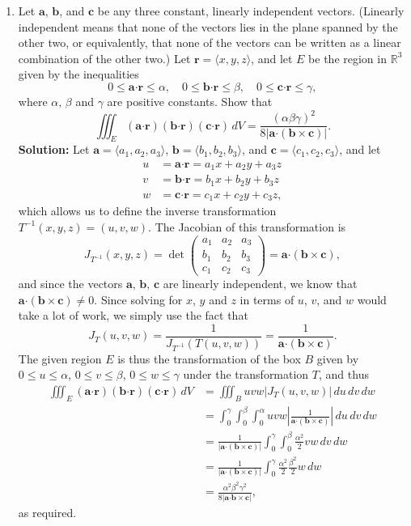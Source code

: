 \documentclass[letterpaper,12pt]{article}
\newcommand{\abs}[1]{\lvert #1\rvert}
\newcommand{\R}{\mathbb{R}}
\newcommand{\dotp}{\boldsymbol{\cdot}}
\newcommand{\aaa}{\mathbf{a}}
\newcommand{\bbb}{\mathbf{b}}
\newcommand{\ccc}{\mathbf{c}}
\renewcommand{\r}{\mathbf{r}}
\begin{document}
\begin{enumerate}
\item  Let $\aaa$, $\bbb$, and $\ccc$ be any three constant, linearly independent vectors. (Linearly independent means that none of the vectors lies in the plane spanned by the other two, or equivalently, that none of the vectors can be written as a linear combination of the other two.) Let $\r = \langle x,y,z\rangle$, and let $E$ be the region in $\R^3$ given by the inequalities
\[
0\leq \aaa\dotp\r\leq \alpha,\quad 0\leq \bbb\dotp\r\leq \beta,\quad 0\leq \ccc\dotp\r\leq \gamma,
\]
where $\alpha,\, \beta$ and $\gamma$ are positive constants. Show that
\[
\iiint_E (\aaa\dotp\r)(\bbb\dotp\r)(\ccc\dotp\r)\,dV = \frac{(\alpha\beta\gamma)^2}{8\abs{\aaa\dotp(\bbb\times\ccc)}}.
\]
\textbf{Solution:} Let $\aaa = \langle a_1,a_2,a_3\rangle$, $\bbb = \langle b_1,b_2,b_3\rangle$, and $\ccc = \langle c_1,c_2,c_3\rangle$, and let
\begin{align*}
u &= \aaa\dotp\r = a_1x+a_2y+a_3z\\
v &= \bbb\dotp\r = b_1x+b_2y+b_3z\\
w &= \ccc\dotp\r = c_1x+c_2y+c_3z,
\end{align*}
which allows us to define the inverse transformation $T^{-1}(x,y,z) = (u,v,w)$. The Jacobian of this transformation is
\[
J_{T^{-1}}(x,y,z) = \det\begin{pmatrix}
a_1&a_2&a_3\\b_1&b_2&b_3\\c_1&c_2&c_3
\end{pmatrix} = \aaa\dotp(\bbb\times\ccc),
\]
and since the vectors $\aaa,\,\bbb,\,\ccc$ are linearly independent, we know that $\aaa\dotp(\bbb\times\ccc)\neq 0$.
Since solving for $x$, $y$ and $z$ in terms of $u$, $v$, and $w$ would take a lot of work, we simply use the fact that
\[
J_T(u,v,w) = \frac{1}{J_{T^{-1}}(T(u,v,w))} = \frac{1}{\aaa\dotp(\bbb\times\ccc)}.
\]
The given region $E$ is thus the transformation of the box $B$ given by $0\leq u\leq \alpha$, $0\leq v\leq \beta$, $0\leq w\leq\gamma$ under the transformation $T$, and thus
\begin{align*}
\iiint_E (\aaa\dotp\r)(\bbb\dotp\r)(\ccc\dotp\r)\,dV & = \iiint_B uvw \abs{J_T(u,v,w)}\,du\,dv\,dw\\
& = \int_0^\gamma\int_0^\beta\int_0^\alpha uvw \left|\frac{1}{\aaa\dotp(\bbb\times\ccc)}\right| \,du\,dv\,dw\\
& = \frac{1}{\abs{\aaa\dotp(\bbb\times\ccc)}}\int_0^\gamma\int_0^\beta \frac{\alpha^2}{2}vw\,dv\,dw\\
& = \frac{1}{\abs{\aaa\dotp(\bbb\times\ccc)}}\int_0^\gamma \frac{\alpha^2}{2}\frac{\beta^2}{2}w\,dw\\
& = \frac{\alpha^2\beta^2\gamma^2}{8\abs{\aaa\dotp{\bbb\times\ccc}}},
\end{align*}
as required.

\end{enumerate}
\end{document}
